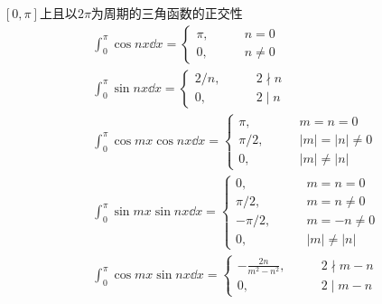 \documentclass[lang = cn, scheme = chinese, thmcnt = section]{elegantbook}
\newcommand{\dis}{\displaystyle}
\begin{document}
\begin{theorem}{$[0,\pi]$上且以$2\pi$为周期的三角函数的正交性}
	\begin{align*}
		& \int_{0}^{\pi}\cos nx\dd x=\begin{cases}
			\pi,\qquad & n=0\\
			0,\qquad & n\ne 0
		\end{cases}\\
		& \int_{0}^{\pi}\sin nx\dd x=\begin{cases}
			2/n,\qquad & 2\nmid n\\
			0,\qquad & 2\mid n
		\end{cases}\\
		& \int_{0}^{\pi}\cos mx\cos nx \dd x=\begin{cases}
			\pi,\qquad & m=n=0\\
			\pi/2,\qquad & |m|=|n|\ne 0\\
			0,\qquad & |m|\ne |n|
		\end{cases}\\
		& \int_{0}^{\pi}\sin mx\sin nx \dd x=\begin{cases}
			0,\qquad & m=n=0\\
			\pi/2,\qquad & m=n\ne 0\\
			-\pi/2,\qquad & m=-n\ne 0\\
			0,\qquad & |m|\ne |n|
		\end{cases}\\
		& \int_{0}^{\pi}\cos mx\sin nx\dd x=\begin{cases}
			\dis-\frac{2n}{m^2-n^2},\qquad & 2\nmid m-n\\
			0,\qquad & 2\mid m-n
		\end{cases}
	\end{align*}
\end{theorem}
\end{document}
